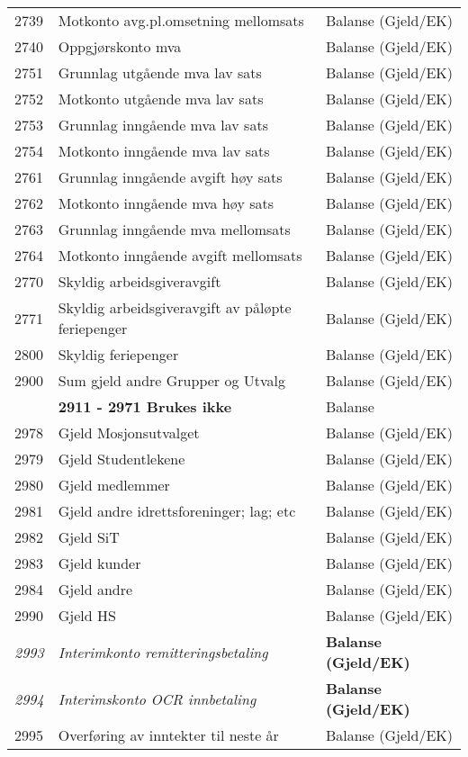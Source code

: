 \begin{table}[H]
\begin{tabular}{l l l }
2739 & Motkonto avg.pl.omsetning mellomsats & Balanse (Gjeld/EK)\\
2740 & Oppgjørskonto mva & Balanse (Gjeld/EK)\\
2751 & Grunnlag utgående mva lav sats & Balanse (Gjeld/EK)\\
2752 & Motkonto utgående mva lav sats & Balanse (Gjeld/EK)\\
2753 & Grunnlag inngående mva lav sats & Balanse (Gjeld/EK)\\
2754 & Motkonto inngående mva lav sats & Balanse (Gjeld/EK)\\
2761 & Grunnlag inngående avgift høy sats & Balanse (Gjeld/EK)\\
2762 & Motkonto inngående mva høy sats & Balanse (Gjeld/EK)\\
2763 & Grunnlag inngående mva mellomsats & Balanse (Gjeld/EK)\\
2764 & Motkonto inngående avgift mellomsats & Balanse (Gjeld/EK)\\
2770 & Skyldig arbeidsgiveravgift & Balanse (Gjeld/EK)\\
2771 & Skyldig arbeidsgiveravgift av påløpte feriepenger & Balanse (Gjeld/EK)\\
2800 & Skyldig feriepenger & Balanse (Gjeld/EK)\\
2900 & Sum gjeld andre Grupper og Utvalg & Balanse (Gjeld/EK)\\
  & {\bfseries 2911 - 2971 Brukes ikke} & Balanse \\
2978 & Gjeld Mosjonsutvalget & Balanse (Gjeld/EK)\\
2979 & Gjeld Studentlekene & Balanse (Gjeld/EK)\\
2980 & Gjeld medlemmer & Balanse (Gjeld/EK)\\
2981 & Gjeld andre idrettsforeninger; lag; etc & Balanse (Gjeld/EK)\\
2982 & Gjeld SiT & Balanse (Gjeld/EK)\\
2983 & Gjeld kunder & Balanse (Gjeld/EK)\\
2984 & Gjeld andre & Balanse (Gjeld/EK)\\
2990 & Gjeld HS & Balanse (Gjeld/EK)\\
\emph{2993} & \emph{Interimkonto remitteringsbetaling} & {\bfseries Balanse (Gjeld/EK)}\\
\emph{2994} & \emph{Interimskonto OCR innbetaling} & {\bfseries Balanse (Gjeld/EK)}\\
2995 & Overføring av inntekter til neste år & Balanse (Gjeld/EK)\\
	\end{tabular}
\end{table}
